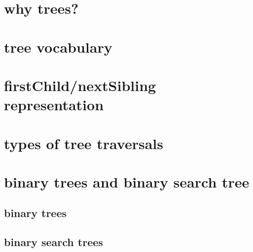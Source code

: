 
\begin{frame}
    \titlepage
\end{frame}

\section{why trees?}


\section{tree vocabulary}



\section{firstChild/nextSibling representation}


\section{types of tree traversals}


\section{binary trees and binary search tree}
\subsection{binary trees}


\subsection{binary search trees}


